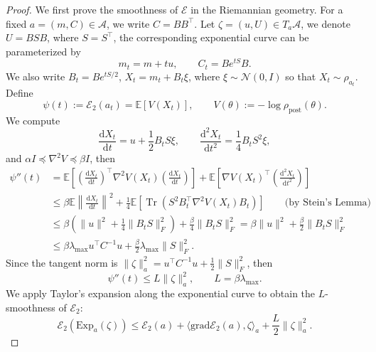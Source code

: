 \documentclass[11pt]{article}
\theoremstyle{plain}
\theoremstyle{definition}
\theoremstyle{remark}
\newcommand{\Tr}{\operatorname{Tr}}
\newcommand{\dd}{\mathrm{d}}
\begin{document}
\begin{proof}
    We first prove the smoothness of $\mathcal{E}$ in the Riemannian geometry. 
    For a fixed $a = (m, C) \in \mathcal{A}$, we write $C = BB^\top$. Let $\zeta = (u, U) \in T_a \mathcal{A}$, we denote $U = BSB$, where $S = S^\top$, the corresponding exponential curve can be parameterized by
    \begin{equation*}
        m_t = m + tu, \qquad C_t = B e^{tS} B.
    \end{equation*}
    We also write $B_t = B e^{tS/2}$, $X_t = m_t + B_t \xi$, where $\xi \sim \mathcal{N} (0, I)$ so that $X_t \sim \rho_{a_t}$.
    Define \begin{equation*}
        \psi(t) := \mathcal{E}_2 (a_t) = \mathbb{E}[V (X_t)], \qquad V(\theta) := -\log \rho_\mathrm{post} (\theta).
    \end{equation*}
    We compute
    \begin{equation*}
        \frac{\dd X_t}{\dd t} = u + \frac{1}{2} B_t S \xi, \qquad \frac{\dd^2 X_t}{\dd t^2} = \frac{1}{4} B_t S^2 \xi,
    \end{equation*}
    and $\alpha I \preceq \nabla^2 V \preceq \beta I$, then
    \begin{align*}
        \psi''(t) &= \mathbb{E} \left[ \left( \frac{\dd X_t}{\dd t} \right)^\top \nabla^2 V(X_t) \left( \frac{\dd X_t}{\dd t} \right) \right] + \mathbb{E} \left[ \nabla V(X_t)^\top \left( \frac{\dd^2 X_t}{\dd t^2} \right) \right] \\
        &\leq \beta \mathbb{E} \left\| \frac{\dd X_t}{\dd t} \right\|^2 + \frac{1}{4} \mathbb{E} \left[ \Tr \left( S^2 B_t^\top \nabla^2 V (X_t) B_t \right) \right] \qquad \text{(by Stein's Lemma)} \\
        &\leq \beta \left( \|u\|^2 + \frac{1}{4} \|B_t S\|_F^2 \right) + \frac{\beta}{4} \|B_t S\|_F^2 = \beta \|u\|^2 + \frac{\beta}{2} \|B_t S\|_F^2 \\
        &\leq \beta \lambda_{\max} u^\top C^{-1} u + \frac{\beta}{2} \lambda_{\max} \|S\|_F^2.
    \end{align*}
    Since the tangent norm is $\| \zeta \|_a^2 = u^\top C^{-1} u + \frac{1}{2} \|S \|_F^2$, then 
    \begin{equation*}
        \psi'' (t) \leq L \| \zeta \|_a^2, \qquad L = \beta \lambda_{\max}.
    \end{equation*}
    We apply Taylor's expansion along the exponential curve to obtain the $L$-smoothness of $\mathcal{E}_2$:
    \begin{equation*}
        \mathcal{E}_2 (\mathrm{Exp}_a (\zeta)) \leq \mathcal{E}_2 (a) + \langle \mathrm{grad} \mathcal{E}_2 (a), \zeta \rangle_a + \frac{L}{2} \| \zeta \|_a^2.

\end{equation*}
\end{proof}
\end{document}
